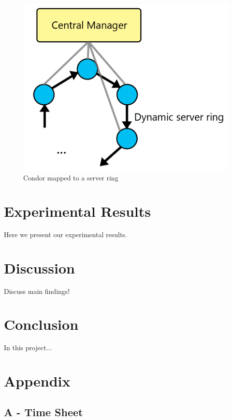 \documentclass[a4paper,10pt]{article}
\begin{document}
\begin{figure}[h]
    \centering
    \includegraphics[scale=0.25]{serverring.png}
    \caption{Condor mapped to a server ring}
    \label{fig:serverring}
\end{figure}

\section{Experimental Results}
\label{sec:results}
Here we present our experimental results.

\section{Discussion}
\label{sec:discussion}
Discuss main findings!

\section{Conclusion}
\label{sec:conclusion}
In this project...

\newpage
\section*{Appendix}

\subsection*{A - Time Sheet}
\label{sec:appendix}
\end{document}
